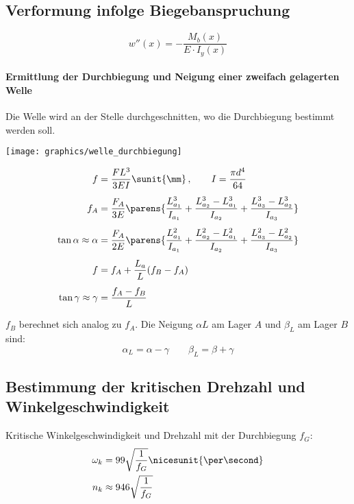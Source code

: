	\subsection{Verformung infolge Biegebanspruchung} %
		\begin{equation*}
			w''(x) = -\frac{M_b(x)}{E\cdot I_y(x)}
		\end{equation*}
		
		\paragraph{Ermittlung der Durchbiegung und Neigung einer zweifach gelagerten Welle} %
			Die Welle wird an der Stelle durchgeschnitten, wo die Durchbiegung bestimmt werden soll.
			
			\hspace{-.0625\columnwidth}
			\texttt{[image: graphics/welle\_durchbiegung]}
			
			\begin{align*}
				f &= \frac{F L^3}{3 E I}\sunit{\mm}\,,\qquad I = \frac{\pi d^4}{64} \\[1ex]
				f_A &= \frac{F_A}{3E} \parens{
					\frac{L_{a_1}^3}{I_{a_1}} + \frac{L_{a_2}^3 - L_{a_1}^3}{I_{a_2}} + \frac{L_{a_3}^3 - L_{a_2}^3}{I_{a_3}}
				} \\[1ex]
				\tan \alpha \approx \alpha &= \frac{F_A}{2E} \parens{
					\frac{L_{a_1}^2}{I_{a_1}} + \frac{L_{a_2}^2 - L_{a_1}^2}{I_{a_2}} + \frac{L_{a_3}^2 - L_{a_2}^2}{I_{a_3}}
				} \\[1ex]
				f &= f_A + \frac{L_a}{L}(f_B - f_A) \\[1ex]
				\tan \gamma \approx \gamma &= \frac{f_A - f_B}{L}
			\end{align*}
			
			$f_B$ berechnet sich analog zu $f_A$. Die Neigung $\alpha L$ am Lager $A$ und $\beta_L$ am Lager $B$ sind:
			\begin{equation*}
				\alpha_L = \alpha - \gamma \qquad \beta_L = \beta + \gamma
			\end{equation*}
	\subsection{Bestimmung der kritischen Drehzahl und Winkelgeschwindigkeit} %
		Kritische Winkelgeschwindigkeit und Drehzahl mit der Durchbiegung $f_G$:
		\begin{align*}
			\omega_k &= 99 \sqrt \frac{1}{f_G} \nicesunit{\per\second} \\
			n_k &\approx 946 \sqrt{\frac{1}{f_G}}
		\end{align*}
